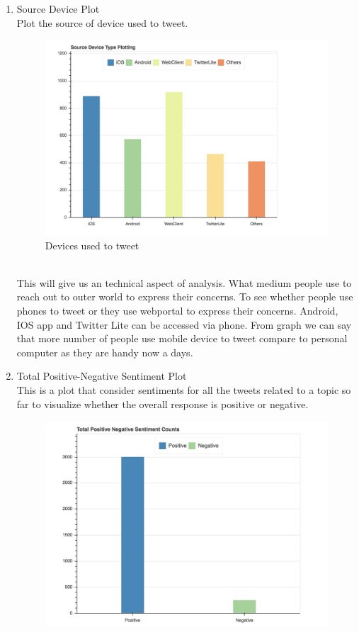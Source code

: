 \documentclass[journal, a4paper]{IEEEtran}
\begin{document}
\begin{enumerate}
	\item Source Device Plot\\ Plot the source of device used to tweet.
    \begin{figure}[!hbt]		
		\begin{center}		
		\includegraphics[width=\columnwidth]{Screen_Shot_2018-05-01_at_7_18_08_PM}
		\caption{Devices used to tweet }		
		\label{fig:tf_plot}
		\end{center}
	\end{figure}
    \\This will give us an technical aspect of analysis. What medium people use to reach out to outer world to express their concerns. To see whether people use phones to tweet or they use webportal to express their concerns. Android, IOS app and Twitter Lite can be accessed via phone. From graph we can say that more number of people use mobile device to tweet compare to personal computer as they are handy now a days.
    \item Total Positive-Negative Sentiment Plot\\ This is a plot that consider sentiments for  all the tweets related to a topic so far to visualize whether the overall response is positive or negative.
    \begin{figure}[!hbt]		
		\begin{center}		
		\includegraphics[width=\columnwidth]{Screen_Shot_2018-05-01_at_7_18_18_PM}

\end{center}
\end{figure}
\end{enumerate}
\end{document}
